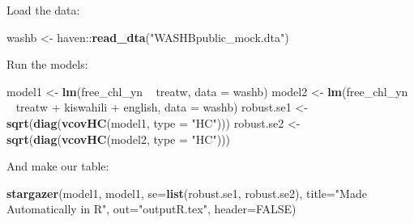 \documentclass[11pt,]{article}
\newenvironment{Shaded}{\begin{snugshade}}{\end{snugshade}}
\newcommand{\KeywordTok}[1]{\textcolor[rgb]{0.13,0.29,0.53}{\textbf{{#1}}}}
\newcommand{\DataTypeTok}[1]{\textcolor[rgb]{0.13,0.29,0.53}{{#1}}}
\newcommand{\StringTok}[1]{\textcolor[rgb]{0.31,0.60,0.02}{{#1}}}
\newcommand{\OtherTok}[1]{\textcolor[rgb]{0.56,0.35,0.01}{{#1}}}
\newcommand{\NormalTok}[1]{{#1}}
\begin{document}
Load the data:

\begin{Shaded}
\begin{Highlighting}[]
\NormalTok{washb <-}\StringTok{ }\NormalTok{haven::}\KeywordTok{read_dta}\NormalTok{(}\StringTok{"WASHBpublic_mock.dta"}\NormalTok{)}
\end{Highlighting}
\end{Shaded}

Run the models:

\begin{Shaded}
\begin{Highlighting}[]
\NormalTok{model1 <-}\StringTok{ }\KeywordTok{lm}\NormalTok{(free_chl_yn ~}\StringTok{ }\NormalTok{treatw, }\DataTypeTok{data =} \NormalTok{washb) }
\NormalTok{model2 <-}\StringTok{ }\KeywordTok{lm}\NormalTok{(free_chl_yn ~}\StringTok{ }\NormalTok{treatw +}\StringTok{ }\NormalTok{kiswahili +}\StringTok{ }\NormalTok{english, }\DataTypeTok{data =} \NormalTok{washb)}
\NormalTok{robust.se1 <-}\StringTok{ }\KeywordTok{sqrt}\NormalTok{(}\KeywordTok{diag}\NormalTok{(}\KeywordTok{vcovHC}\NormalTok{(model1, }\DataTypeTok{type =} \StringTok{"HC"}\NormalTok{)))}
\NormalTok{robust.se2 <-}\StringTok{ }\KeywordTok{sqrt}\NormalTok{(}\KeywordTok{diag}\NormalTok{(}\KeywordTok{vcovHC}\NormalTok{(model2, }\DataTypeTok{type =} \StringTok{"HC"}\NormalTok{)))}
\end{Highlighting}
\end{Shaded}

And make our table:

\begin{Shaded}
\begin{Highlighting}[]
\KeywordTok{stargazer}\NormalTok{(model1, model1, }\DataTypeTok{se=}\KeywordTok{list}\NormalTok{(robust.se1, robust.se2), }
          \DataTypeTok{title=}\StringTok{"Made Automatically in R"}\NormalTok{, }
          \DataTypeTok{out=}\StringTok{"outputR.tex"}\NormalTok{, }\DataTypeTok{header=}\OtherTok{FALSE}\NormalTok{)}
\end{Highlighting}
\end{Shaded}
\end{document}
